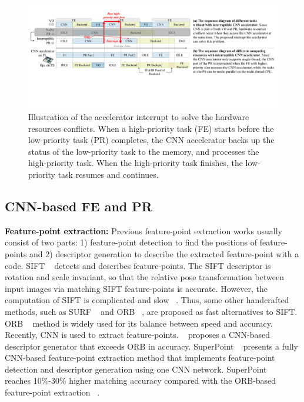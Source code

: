 
\label{sec:relate}


\begin{figure}[t]
	\centering
    \includegraphics[width=0.95\linewidth]{fig/interDPR.pdf}
    \vspace{-2mm}
    \caption{Illustration of the accelerator interrupt to solve the hardware resources conflicts. When a high-priority task (FE) starts before the low-priority task (PR) completes, the CNN accelerator backs up the status of the low-priority task to the memory, and processes the high-priority task. When the high-priority task finishes, the low-priority task resumes and continues.
    }
	\label{fig:interDPR}
\end{figure}


\subsection{ CNN-based FE and PR }

\textbf{Feature-point extraction:} Previous feature-point extraction works usually consist of two parts: 1) feature-point detection to find the positions of feature-points and 2) descriptor generation to describe the extracted feature-point with a code.
SIFT  ~\cite{Lowe-478}  detects and describes feature-points. The SIFT descriptor is rotation and scale invariant, so that the relative pose transformation between input images via matching SIFT feature-points is accurate. However, the computation of SIFT is complicated and slow  ~\cite{bay2006surf}. Thus, some other handcrafted methods, such as SURF ~\cite{bay2006surf} and ORB  ~\cite{Mur-Artal:2017281}, are proposed as fast alternatives to SIFT. ORB  ~\cite{Mur-Artal:2017281} method is widely used for its balance between speed and accuracy.
Recently, CNN is used to extract feature-points.  ~\cite{simo2015discriminative} proposes a CNN-based descriptor generator that exceeds ORB in accuracy.
SuperPoint  ~\cite{detone2018superpoint} presents a fully CNN-based feature-point extraction method that implements feature-point detection and descriptor generation using one CNN network. SuperPoint ~\cite{detone2018superpoint} reaches 10\%-30\% higher matching accuracy compared with the ORB-based feature-point extraction  ~\cite{Mur-Artal:2017281}. 

